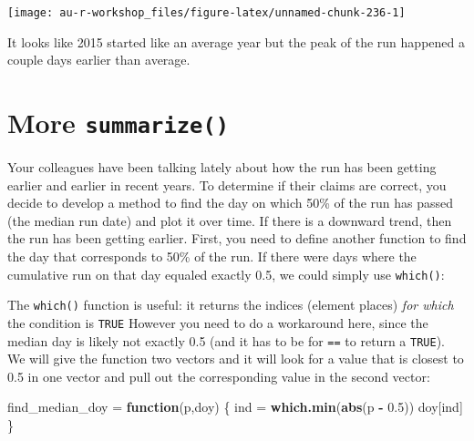 \documentclass[]{book}
\newenvironment{Shaded}{\begin{snugshade}}{\end{snugshade}}
\newcommand{\KeywordTok}[1]{\textcolor[rgb]{0.13,0.29,0.53}{\textbf{#1}}}
\newcommand{\FloatTok}[1]{\textcolor[rgb]{0.00,0.00,0.81}{#1}}
\newcommand{\StringTok}[1]{\textcolor[rgb]{0.31,0.60,0.02}{#1}}
\newcommand{\ControlFlowTok}[1]{\textcolor[rgb]{0.13,0.29,0.53}{\textbf{#1}}}
\newcommand{\OperatorTok}[1]{\textcolor[rgb]{0.81,0.36,0.00}{\textbf{#1}}}
\newcommand{\NormalTok}[1]{#1}
\theoremstyle{definition}
\theoremstyle{definition}
\theoremstyle{definition}
\theoremstyle{remark}
\begin{document}
\begin{center}\texttt{[image: au-r-workshop\_files/figure-latex/unnamed-chunk-236-1]} \end{center}

It looks like 2015 started like an average year but the peak of the run
happened a couple days earlier than average.

\section{\texorpdfstring{More
\texttt{summarize()}}{More summarize()}}\label{more-summarize}

Your colleagues have been talking lately about how the run has been
getting earlier and earlier in recent years. To determine if their
claims are correct, you decide to develop a method to find the day on
which 50\% of the run has passed (the median run date) and plot it over
time. If there is a downward trend, then the run has been getting
earlier. First, you need to define another function to find the day that
corresponds to 50\% of the run. If there were days where the cumulative
run on that day equaled exactly 0.5, we could simply use
\texttt{which()}:

\begin{Shaded}
\end{Shaded}

The \texttt{which()} function is useful: it returns the indices (element
places) \emph{for which} the condition is \texttt{TRUE} However you need
to do a workaround here, since the median day is likely not exactly 0.5
(and it has to be for \texttt{==} to return a \texttt{TRUE}). We will
give the function two vectors and it will look for a value that is
closest to 0.5 in one vector and pull out the corresponding value in the
second vector:

\begin{Shaded}
\begin{Highlighting}[]
\NormalTok{find_median_doy =}\StringTok{ }\ControlFlowTok{function}\NormalTok{(p,doy) \{}
\NormalTok{  ind =}\StringTok{ }\KeywordTok{which.min}\NormalTok{(}\KeywordTok{abs}\NormalTok{(p }\OperatorTok{-}\StringTok{ }\FloatTok{0.5}\NormalTok{))}
\NormalTok{  doy[ind]}
\NormalTok{\}}
\end{Highlighting}
\end{Shaded}
\end{document}
